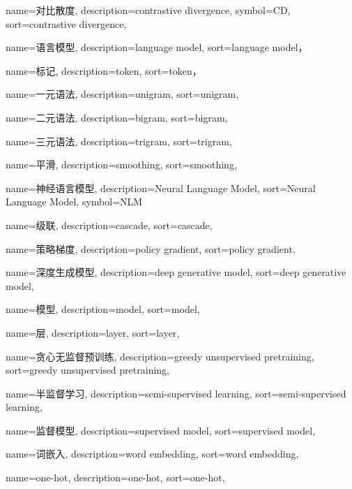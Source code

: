 {
  name=对比散度,
  description={contrastive divergence},
  symbol={CD},
  sort={contrastive divergence},
}

{
  name=语言模型,
  description={language model},
  sort={language model}，
}

{
  name=标记,
  description={token},
  sort={token}，
}

{
  name=一元语法,
  description={unigram},
  sort={unigram},
}

{
  name=二元语法,
  description={bigram},
  sort={bigram},
}

{
  name=三元语法,
  description={trigram},
  sort={trigram},
}

{
  name=平滑,
  description={smoothing},
  sort={smoothing},
}

{
  name=神经语言模型,
  description={Neural Language Model},
  sort={Neural Language Model},
  symbol={NLM}
}

{
  name=级联,
  description={cascade},
  sort={cascade},
}

{
  name=策略梯度,
  description={policy gradient},
  sort={policy gradient},
}

{
  name=深度生成模型,
  description={deep generative model},
  sort={deep generative model},
}

{
  name=模型,
  description={model},
  sort={model},
}

{
  name=层,
  description={layer},
  sort={layer},
}

{
  name=贪心无监督预训练,
  description={greedy unsupervised pretraining},
  sort={greedy unsupervised pretraining},
}

{
  name=半监督学习,
  description={semi-supervised learning},
  sort={semi-supervised learning},
}

{
  name=监督模型,
  description={supervised model},
  sort={supervised model},
}

{
  name=词嵌入,
  description={word embedding},
  sort={word embedding},
}

{
  name=one-hot,
  description={one-hot},
  sort={one-hot},
}

